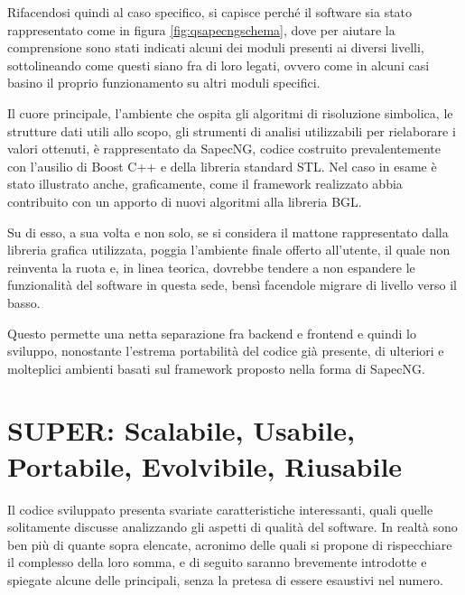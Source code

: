 Rifacendosi quindi al caso specifico, si capisce perché il software sia stato rappresentato come in figura \ref{fig:qsapecngschema}, dove per aiutare la comprensione sono stati indicati alcuni dei moduli presenti ai diversi livelli, sottolineando come questi siano fra di loro legati, ovvero come in alcuni casi basino il proprio funzionamento su altri moduli specifici.

Il cuore principale, l'ambiente che ospita gli algoritmi di risoluzione simbolica, le strutture dati utili allo scopo, gli strumenti di analisi utilizzabili per rielaborare i valori ottenuti, è rappresentato da SapecNG, codice costruito prevalentemente con l'ausilio di Boost C++ e della libreria standard STL. Nel caso in esame è stato illustrato anche, graficamente, come il framework realizzato abbia contribuito con un apporto di nuovi algoritmi alla libreria BGL.

Su di esso, a sua volta e non solo, se si considera il mattone rappresentato dalla libreria grafica utilizzata, poggia l'ambiente finale offerto all'utente, il quale non reinventa la ruota e, in linea teorica, dovrebbe tendere a non espandere le funzionalità del software in questa sede, bensì facendole migrare di livello verso il basso.

Questo permette una netta separazione fra backend e frontend e quindi lo sviluppo, nonostante l'estrema portabilità del codice già presente, di ulteriori e molteplici ambienti basati sul framework proposto nella forma di SapecNG.

\section{SUPER: Scalabile, Usabile, Portabile, Evolvibile, Riusabile}

Il codice sviluppato presenta svariate caratteristiche interessanti, quali quelle solitamente discusse analizzando gli aspetti di qualità del software. In realtà sono ben più di quante sopra elencate, acronimo delle quali si propone di rispecchiare il complesso della loro somma, e di seguito saranno brevemente introdotte e spiegate alcune delle principali, senza la pretesa di essere esaustivi nel numero.

